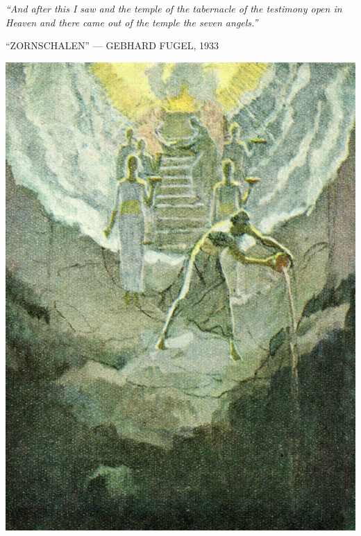 \clearpage
\thispagestyle{empty}
\null\vfill
\settowidth{}
\begin{center}
\parbox{\longest}{%
  \raggedright{\huge\itshape%
    ``And after this I saw and the temple of the tabernacle of the testimony open in Heaven and there came out of the temple the seven angels.'' \par\bigskip
  }
  \raggedleft\Large\MakeUppercase{``Zornschalen'' — Gebhard Fugel, 1933}\par%
}
\vfill\vfill
\clearpage\newpage
\end{center}
\newpage
\thispagestyle{empty}
\begin{center}
	\includegraphics[width=1\textwidth]{images/illustrations/fugelzornschalen}
\end{center}